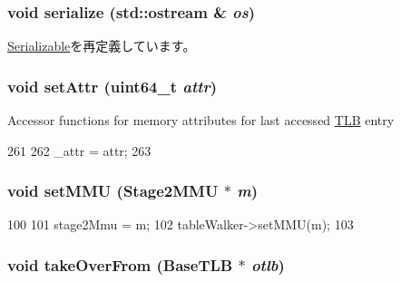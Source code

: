 \hypertarget{classArmISA_1_1TLB_a53e036786d17361be4c7320d39c99b84}{
\subsubsection[{serialize}]{\setlength{\rightskip}{0pt plus 5cm}void serialize (std::ostream \& {\em os})}}
\label{classArmISA_1_1TLB_a53e036786d17361be4c7320d39c99b84}


\hyperlink{classSerializable_ad6272f80ae37e8331e3969b3f072a801}{Serializable}を再定義しています。\hypertarget{classArmISA_1_1TLB_af863223c2fa90b0bbb305626dc3bc604}{
\subsubsection[{setAttr}]{\setlength{\rightskip}{0pt plus 5cm}void setAttr (uint64\_\-t {\em attr})}}
\label{classArmISA_1_1TLB_af863223c2fa90b0bbb305626dc3bc604}
Accessor functions for memory attributes for last accessed \hyperlink{classArmISA_1_1TLB}{TLB} entry 


\begin{DoxyCode}
261     {
262         _attr = attr;
263     }
\end{DoxyCode}
\hypertarget{classArmISA_1_1TLB_ae888fc9d1a9bad8784469601dcf8d436}{
\subsubsection[{setMMU}]{\setlength{\rightskip}{0pt plus 5cm}void setMMU ({\bf Stage2MMU} $\ast$ {\em m})}}
\label{classArmISA_1_1TLB_ae888fc9d1a9bad8784469601dcf8d436}



\begin{DoxyCode}
100 {
101     stage2Mmu = m;
102     tableWalker->setMMU(m);
103 }
\end{DoxyCode}
\hypertarget{classArmISA_1_1TLB_a15b6c15c1be2ca4de3e65772a02aa29f}{
\subsubsection[{takeOverFrom}]{\setlength{\rightskip}{0pt plus 5cm}void takeOverFrom ({\bf BaseTLB} $\ast$ {\em otlb})}}
\label{classArmISA_1_1TLB_a15b6c15c1be2ca4de3e65772a02aa29f}



